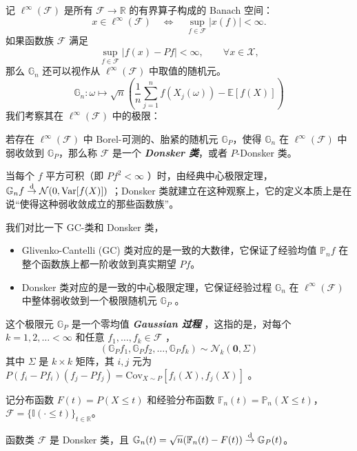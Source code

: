 记 $\ell^\infty(\mathscr F)$ 是所有 $\mathscr F\to \mathbb R$ 的有界算子构成的 Banach 空间：
\[
x\in \ell^\infty(\mathscr F)\quad \iff \quad \sup_{f\in\mathscr F}|x(f)|<\infty.
\]
如果函数族 $\mathscr F$ 满足
\[
\sup_{f\in\mathscr F}|f(x)-Pf|<\infty,\qquad \forall x\in\mathscr X,
\]
那么 $\mathbb G_n$ 还可以视作从 $\ell^\infty (\mathscr F)$ 中取值的随机元。
$$\mathbb G_n:\omega\mapsto \sqrt n\left(\frac1n\sum_{j=1}^nf(X_j(\omega))-\mathbb{E}[f(X)]\right)$$
我们考察其在 $\ell^\infty(\mathscr F)$ 中的极限：
\begin{definition*}[Donsker 类]
若存在 $\ell^\infty(\mathscr F)$ 中 Borel-可测的、胎紧的随机元 $\mathbb G_P$，使得 $\mathbb G_n$ 在 $\ell^\infty(\mathscr F)$ 中弱收敛到 $\mathbb G_P$，那么称 $\mathscr F$ 是一个 \textbf{\emph{Donsker 类}}，或者 $P$-Donsker 类。
\end{definition*}

当每个 $f$ 平方可积（即 $Pf^2<\infty$ ）时，由经典中心极限定理， $\mathbb G_n f\overset{\rm d}\to \mathcal N(0,\mathrm{Var}[f(X)])$ ；Donsker 类就建立在这种观察上，它的定义本质上是在说``使得这种弱收敛成立的那些函数族''。

我们对比一下 GC-类和 Donsker 类，

\begin{itemize}
\tightlist
\item
  Glivenko-Cantelli (GC) 类对应的是一致的大数律，它保证了经验均值 $\mathbb{P}_n f$ 在整个函数族上都一阶收敛到真实期望 $Pf$。
\item
  Donsker 类对应的是一致的中心极限定理，它保证经验过程 $\mathbb G_n$ 在 $\ell^\infty(\mathscr F)$ 中整体弱收敛到一个极限随机元 $\mathbb G_P$ 。
\end{itemize}

这个极限元 $\mathbb G_P$ 是一个零均值 \textbf{\emph{Gaussian 过程}} ，这指的是，对每个 $k=1,2,\dots<\infty$ 和任意 $f_1,\dots ,f_k\in\mathscr F$ ， 
$$(\mathbb G_P f_1,\mathbb G_P f_2,\dots,\mathbb G_Pf_k)\sim \mathcal N_k(\mathbf{0},\Sigma)$$
其中 $\Sigma$ 是 $k\times k$ 矩阵，其 $i,j$ 元为 $P(f_i-P f_i)(f_j-Pf_j)=\mathrm{Cov}_{X\sim P}[f_i(X),f_j(X)]$ 。

\begin{example}[Brownian 桥]
记分布函数 $F(t)=P(X\le t)$ 和经验分布函数 $\mathbb F_n(t)=\mathbb P_n(X\le t)$，$\mathscr F=\{\mathbb I(\cdot \le t)\}_{t\in\mathbb R}$。
\end{example}

\begin{theorem}
\label{thm:ch9:donsker}
函数类 $\mathscr F$ 是 Donsker 类，且 $\mathbb G_n(t)=\sqrt n(\mathbb F_n(t)-F(t))\overset{\rm d}\to \mathbb G_P(t)$。
\end{theorem}

